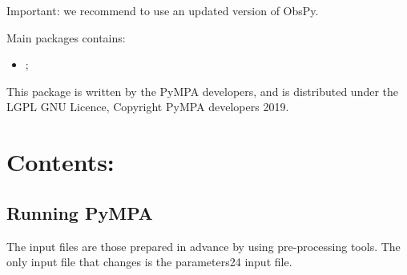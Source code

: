 \documentclass[a4paper,12pt,english]{sphinxmanual}
\begin{document}
Important: we recommend to use an updated version of ObsPy.

Main packages contains:
\begin{itemize}
\item {} 
{\hyperref[\detokenize{sub/main.pympa::doc}]{}};

\end{itemize}

This package is written by the PyMPA developers, and is distributed under the LGPL GNU Licence, Copyright PyMPA developers 2019.


\section{Contents:}
\label{\detokenize{main:contents}}

\subsection{Running PyMPA}
\label{\detokenize{sub/main.pympa:running-pympa}}\label{\detokenize{sub/main.pympa::doc}}
The input files are those prepared in advance by using pre-processing tools. The only input file that changes is the parameters24 input file.
\end{document}
